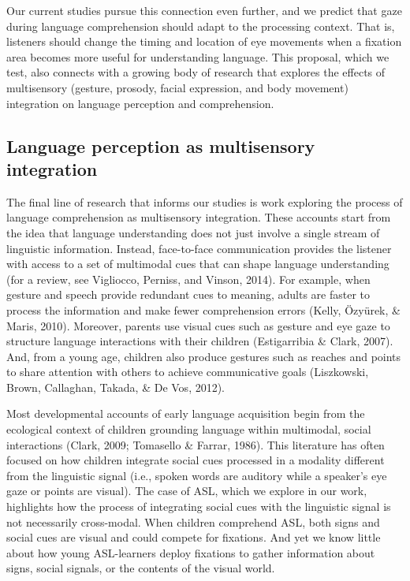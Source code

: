 \documentclass[,man,floatsintext]{apa6}
\begin{document}
Our current studies pursue this connection even further, and we predict that gaze during language comprehension should adapt to the processing context. That is, listeners should change the timing and location of eye movements when a fixation area becomes more useful for understanding language. This proposal, which we test, also connects with a growing body of research that explores the effects of multisensory (gesture, prosody, facial expression, and body movement) integration on language perception and comprehension.

\hypertarget{language-perception-as-multisensory-integration}{%
\subsection{Language perception as multisensory integration}\label{language-perception-as-multisensory-integration}}

The final line of research that informs our studies is work exploring the process of language comprehension as multisensory integration. These accounts start from the idea that language understanding does not just involve a single stream of linguistic information. Instead, face-to-face communication provides the listener with access to a set of multimodal cues that can shape language understanding (for a review, see Vigliocco, Perniss, and Vinson, 2014). For example, when gesture and speech provide redundant cues to meaning, adults are faster to process the information and make fewer comprehension errors (Kelly, Özyürek, \& Maris, 2010). Moreover, parents use visual cues such as gesture and eye gaze to structure language interactions with their children (Estigarribia \& Clark, 2007). And, from a young age, children also produce gestures such as reaches and points to share attention with others to achieve communicative goals (Liszkowski, Brown, Callaghan, Takada, \& De Vos, 2012).

Most developmental accounts of early language acquisition begin from the ecological context of children grounding language within multimodal, social interactions (Clark, 2009; Tomasello \& Farrar, 1986). This literature has often focused on how children integrate social cues processed in a modality different from the linguistic signal (i.e., spoken words are auditory while a speaker's eye gaze or points are visual). The case of ASL, which we explore in our work, highlights how the process of integrating social cues with the linguistic signal is not necessarily cross-modal. When children comprehend ASL, both signs and social cues are visual and could compete for fixations. And yet we know little about how young ASL-learners deploy fixations to gather information about signs, social signals, or the contents of the visual world.
\end{document}

